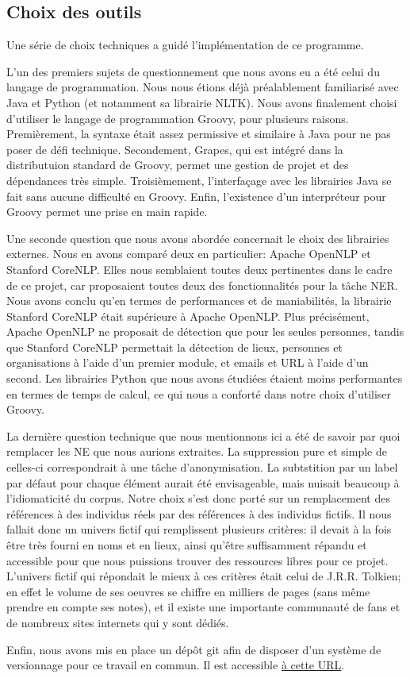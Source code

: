 \documentclass{article}
\begin{document}
\subsection{Choix des outils}
\par
Une série de choix techniques a guidé l'implémentation de ce programme.
\par
L'un des premiers sujets de questionnement que nous avons eu a été celui du langage de programmation.
Nous nous étions déjà préalablement familiarisé avec Java et Python (et notamment sa librairie NLTK).
Nous avons finalement choisi d'utiliser le langage de programmation Groovy, pour plusieurs raisons.
Premièrement, la syntaxe était assez permissive et similaire à Java pour ne pas poser de défi technique.
Secondement, Grapes, qui est intégré dans la distributuion standard de Groovy, permet une gestion de projet et des dépendances très simple.
Troisièmement, l'interfaçage avec les librairies Java se fait sans aucune difficulté en Groovy.
Enfin, l'existence d'un interpréteur pour Groovy permet une prise en main rapide.
\par
Une seconde question que nous avons abordée concernait le choix des librairies externes.
Nous en avons comparé deux en particulier: Apache OpenNLP et Stanford CoreNLP.
Elles nous semblaient toutes deux pertinentes dans le cadre de ce projet, car proposaient toutes deux des fonctionnalités pour la tâche NER.
Nous avons conclu qu'en termes de performances et de maniabilités, la librairie Stanford CoreNLP était supérieure à Apache OpenNLP.
Plus précisément, Apache OpenNLP ne proposait de détection que pour les seules personnes, tandis que Stanford CoreNLP permettait la détection de lieux, personnes et organisations à l'aide d'un premier module, et emails et URL à l'aide d'un second.
Les librairies Python que nous avons étudiées étaient moins performantes en termes de temps de calcul, ce qui nous a conforté dans notre choix d'utiliser Groovy.
\par
La dernière question technique que nous mentionnons ici a été de savoir par quoi remplacer les NE  que nous aurions extraites.
La suppression pure et simple de celles-ci correspondrait à une tâche d'anonymisation.
La subtstition par un label par défaut pour chaque élément aurait été envisageable, mais nuisait beaucoup à l'idiomaticité du corpus.
Notre choix s'est donc porté sur un remplacement des références à des individus réels par des références à des individus fictifs.
Il nous fallait donc un univers fictif qui remplissent plusieurs critères: il devait à la fois être très fourni en noms et en lieux, ainsi qu'être suffisamment répandu et accessible pour que nous puissions trouver des ressources libres pour ce projet.
L'univers fictif qui répondait le mieux à ces critères était celui de J.R.R. Tolkien; en effet le volume de ses oeuvres se chiffre en milliers de pages (sans même prendre en compte ses notes), et il existe une importante communauté de fans et de nombreux sites internets qui y sont dédiés.
\par
Enfin, nous avons mis en place un dépôt git afin de disposer d'un système de versionnage pour ce travail en commun. Il est accessible \href{https://github.com/Sachka/Tolkienizer}{à cette URL}.
\end{document}
